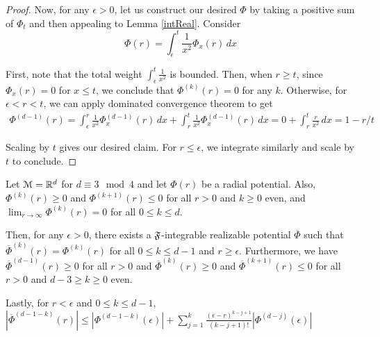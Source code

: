 \begin{proof}
Now, for any $\epsilon > 0$, let us construct our desired $\Phi$ by taking a positive sum of $\Phi_t$ and then appealing to Lemma \ref{intReal}. Consider
%
\[\Phi(r) = \int_{\epsilon}^{t} \frac{1}{x^2}\Phi_x(r) \, dx\]

First, note that the total weight $\int_\epsilon^t \frac{1}{x^2}$ is bounded. Then, when $r \geq t$, since $\Phi_x(r) = 0$ for $x \leq t$, we conclude that $\Phi^{(k)}(r) = 0$ for any $k$. Otherwise, for $\epsilon < r < t$, we can apply dominated convergence theorem to get
\begin{align*}
\Phi^{(d-1)}(r) = \int_{\epsilon}^r \frac{1}{x^2}\Phi_x^{(d-1)}(r) \, dx + \int_{r}^t \frac{1}{x^2} \Phi_x^{(d-1)}(r) \, dx
 = 0 + \int_r^t \frac{r}{x^2} \, dx = 1 -r/t 
\end{align*}

Scaling by $t$ gives our desired claim. For $r\leq \epsilon$, we integrate similarly and scale by $t$ to conclude.
\end{proof}

\begin{lemma}\label{transConstruct}
Let $\mathcal{M} = {\mathbb{R}}^d$ for $d \equiv 3 \mod 4$ and let $\Phi(r)$ be a radial potential. Also, $\Phi^{(k)}(r) \geq 0$ and $\Phi^{(k+1)}(r)\leq 0$ for all $r > 0$ and $k \geq 0 $ even, and $\lim_{r \to \infty} \Phi^{(k)}(r) = 0$ for all $0 \leq k \leq d$. 

Then, for any $\epsilon > 0$, there exists a ${\mathfrak{F}}$-integrable realizable potential $\overline{\Phi}$  such that $\overline{\Phi}^{(k)}(r) = \Phi^{(k)}(r)$ for all $0 \leq k \leq d-1$ and $r \geq \epsilon$. Furthermore, we have $\overline{\Phi}^{(d-1)}(r) \geq 0$ for all $r  > 0$ and $\overline{\Phi}^{(k)}(r) \geq 0$ and $\overline{\Phi}^{(k+1)}(r)\leq 0$ for all $r > 0$ and $d - 3 \geq k \geq 0 $ even.

Lastly, for $r < \epsilon$ and $0 \leq k \leq d-1$, $|\overline{\Phi}^{(d-1-k)}(r)| \leq |\Phi^{(d-1-k)}(\epsilon)| + \sum_{j=1}^k \frac{(\epsilon - r)^{k-j+1}}{(k-j+1)!} |\Phi^{(d-j)}(\epsilon)|$
\end{lemma}

